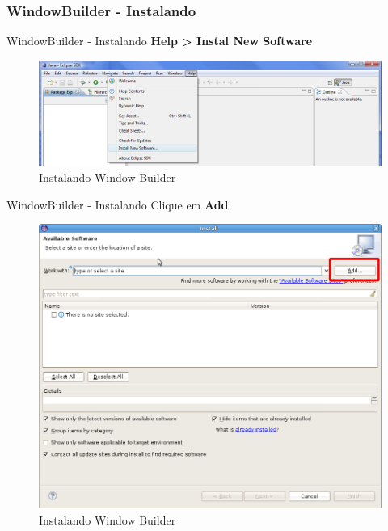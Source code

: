 \documentclass[10pt]{beamer}
\begin{document}
\subsubsection{WindowBuilder - Instalando }
\begin{frame}{WindowBuilder - Instalando }
\textbf{Help > Instal New Software}
  \begin{figure}[!htb]
    \centering
    \includegraphics[scale=.4]{instalando_window_builder_1}
    \caption{Instalando Window Builder}
    \label{figRotulo}
  \end{figure}
\end{frame}{}

\begin{frame}{WindowBuilder - Instalando }
Clique em \textbf{Add}.
  \begin{figure}[!htb]
    \centering
    \includegraphics[scale=.3]{window_builder_add}
    \caption{Instalando Window Builder}
    \label{figRotulo}
  \end{figure}
\end{frame}{}
\end{document}
